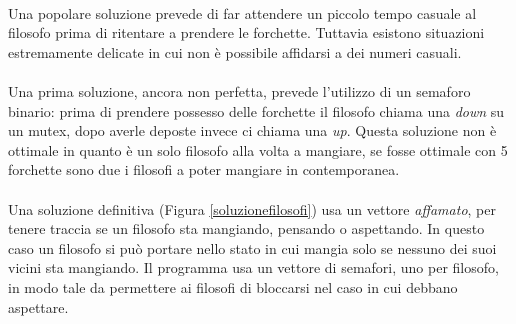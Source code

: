 \paragraph*{}
Una popolare soluzione prevede di far attendere un piccolo tempo casuale al filosofo prima di ritentare a prendere le forchette. Tuttavia esistono situazioni estremamente delicate in cui non è possibile affidarsi a dei numeri casuali.

\paragraph*{}
Una prima soluzione, ancora non perfetta, prevede l'utilizzo di un semaforo binario: prima di prendere possesso delle forchette il filosofo chiama una \textit{down} su un mutex, dopo averle deposte invece ci chiama una \textit{up}. Questa soluzione non è ottimale in quanto è un solo filosofo alla volta a mangiare, se fosse ottimale con 5 forchette sono due i filosofi a poter mangiare in contemporanea.

\paragraph*{}
Una soluzione definitiva (Figura \ref{soluzionefilosofi}) usa un vettore \textit{affamato}, per tenere traccia se un filosofo sta mangiando, pensando o aspettando. In questo caso un filosofo si può portare nello stato in cui mangia solo se nessuno dei suoi vicini sta mangiando. Il programma usa un vettore di semafori, uno per filosofo, in modo tale da permettere ai filosofi di bloccarsi nel caso in cui debbano aspettare.

